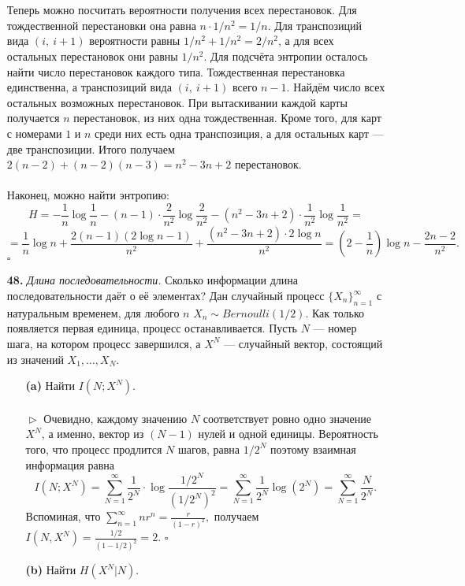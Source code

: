 \documentclass{article}
\newcommand{\ds}{\displaystyle}
\begin{document}
\begin{enumerate}
\\\\Теперь можно посчитать вероятности получения всех перестановок. Для тождественной перестановки она равна $n \cdot 1/n^2 = 1/n.$ Для транспозиций вида $(i,\ i + 1)$ вероятности равны $1/n^2 + 1/n^2 = 2/n^2$, а для всех остальных перестановок они равны $1/n^2$. Для подсчёта энтропии осталось найти число перестановок каждого типа. Тождественная перестановка единственна, а транспозиций вида $(i,\ i + 1)$ всего $n - 1$. Найдём число всех остальных возможных перестановок. При вытаскивании каждой карты получается $n$ перестановок, из них одна тождественная. Кроме того, для карт с номерами $1$ и $n$ среди них есть одна транспозиция, а для остальных карт --- две транспозиции. Итого получаем $2(n - 2) + (n - 2)(n - 3) = n^2 - 3n + 2$ перестановок.
\\\\Наконец, можно найти энтропию:
$$H = -\frac{1}{n}\log \frac{1}{n} - (n - 1) \cdot \frac{2}{n^2} \log \frac{2}{n^2} - (n^2 - 3n + 2) \cdot \frac{1}{n^2}\log \frac{1}{n^2} =$$
$$= \frac{1}{n}\log n + \frac{2(n - 1)(2\log n - 1)}{n^2} + \frac{(n^2 - 3n + 2) \cdot 2\log n}{n^2} = \left(2 - \frac{1}{n}\right)\log n - \frac{2n - 2}{n^2}.$$
$\square$
\\
\item[\bfseries 48.] \textit{Длина последовательности.} Сколько информации длина последовательности даёт о её элементах? Дан случайный процесс $\{X_n\}_{n = 1}^{\infty}$ с натуральным временем, для любого $n$ $X_n \sim Bernoulli(1/2)$. Как только появляется первая единица, процесс останавливается. Пусть $N$ --- номер шага, на котором процесс завершился, а $X^N$ --- случайный вектор, состоящий из значений $X_1, \ldots, X_N$. 
\begin{enumerate}
\item[\bfseries (a)] Найти $I(N; X^N)$.
\\\\$\vartriangleright$ Очевидно, каждому значению $N$ соответствует ровно одно значение $X^N$, а именно, вектор из $(N - 1)$ нулей и одной единицы. Вероятность того, что процесс продлится $N$ шагов, равна $1/2^N$ поэтому взаимная информация равна
$$I(N; X^N) = \sum_{N = 1}^\infty \frac{1}{2^N} \cdot \log \frac{1/2^N}{(1/2^N)^2} = \sum_{N = 1}^\infty \frac{1}{2^N} \log (2^N) = \sum_{N = 1}^\infty \frac{N}{2^N}.$$
Вспоминая, что $\ds \sum_{n = 1}^\infty n r^n = \frac{r}{(1 - r)^2},$ получаем $\ds I(N, X^N) = \frac{1/2}{(1 - 1/2)^2} = 2.$ $\square$
\\
\item[\bfseries (b)] Найти $H(X^N|N)$.

\end{enumerate}
\end{enumerate}
\end{document}

